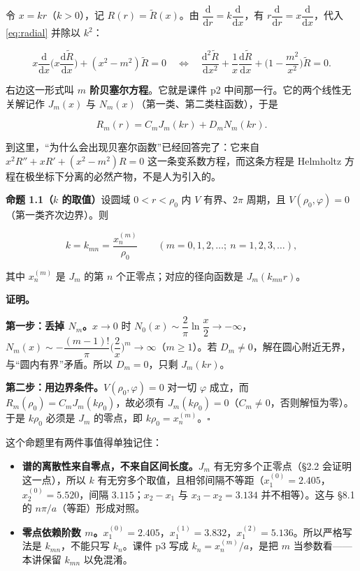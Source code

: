 \documentclass[11pt]{ctexart}
\let\origsubhdr\subhdr
\renewcommand{\subhdr}[1]{\par\needspace{3\baselineskip}\origsubhdr{#1}}
\newcommand{\pfline}{\par\smallskip\noindent\textbf{证明。}\enspace}
\begin{document}

令 $x=kr$（$k>0$），记 $R(r)=\tilde R(x)$。由 $\dfrac{\mathrm d}{\mathrm dr}=k\dfrac{\mathrm d}{\mathrm dx}$，有 $r\dfrac{\mathrm d}{\mathrm dr}=x\dfrac{\mathrm d}{\mathrm dx}$，代入 \eqref{eq:radial} 并除以 $k^2$：

\begin{equation}
x\frac{\mathrm d}{\mathrm dx}\Big(x\frac{\mathrm d\tilde R}{\mathrm dx}\Big)+(x^2-m^2)\tilde R=0
\quad\Longleftrightarrow\quad
\frac{\mathrm d^2\tilde R}{\mathrm dx^2}+\frac1x\frac{\mathrm d\tilde R}{\mathrm dx}+\Big(1-\frac{m^2}{x^2}\Big)\tilde R=0 .
\label{eq:bessel}
\end{equation}

右边这一形式叫 \textbf{$m$ 阶贝塞尔方程}。它就是课件 p2 中间那一行。它的两个线性无关解记作 $J_m(x)$ 与 $N_m(x)$（第一类、第二类柱函数），于是

\begin{equation}
R_m(r)=C_mJ_m(kr)+D_mN_m(kr).
\label{eq:Rgen}
\end{equation}

到这里，“为什么会出现贝塞尔函数”已经回答完了：它来自 $x^2R''+xR'+(x^2-m^2)R=0$ 这一条变系数方程，而这条方程是 Helmholtz 方程在极坐标下分离的必然产物，不是人为引入的。


\textbf{命题 1.1（$k$ 的取值）}\quad 设圆域 $0<r<\rho_0$ 内 $V$ 有界、$2\pi$ 周期，且 $V(\rho_0,\varphi)=0$（第一类齐次边界）。则

\[
k=k_{mn}=\frac{x_n^{(m)}}{\rho_0}\qquad(m=0,1,2,\dots;\ n=1,2,3,\dots),
\]

其中 $x_n^{(m)}$ 是 $J_m$ 的第 $n$ 个正零点；对应的径向函数是 $J_m(k_{mn}r)$。

\pfline

\textbf{第一步：丢掉 $N_m$。}$x\to0$ 时 $N_0(x)\sim\dfrac2\pi\ln\dfrac x2\to-\infty$，$N_m(x)\sim-\dfrac{(m-1)!}{\pi}\Big(\dfrac2x\Big)^m\to\infty$（$m\ge1$）。若 $D_m\ne0$，解在圆心附近无界，与“圆内有界”矛盾。所以 $D_m=0$，只剩 $J_m(kr)$。

\textbf{第二步：用边界条件。}$V(\rho_0,\varphi)=0$ 对一切 $\varphi$ 成立，而 $R_m(\rho_0)=C_mJ_m(k\rho_0)$，故必须有 $J_m(k\rho_0)=0$（$C_m\ne0$，否则解恒为零）。于是 $k\rho_0$ 必须是 $J_m$ 的零点，即 $k\rho_0=x_n^{(m)}$。$\square$

这个命题里有两件事值得单独记住：

\begin{itemize}
  \item \textbf{谱的离散性来自零点，不来自区间长度。}$J_m$ 有无穷多个正零点（\S2.2 会证明这一点），所以 $k$ 有无穷多个取值，且相邻间隔不等距（$x_1^{(0)}=2.405$，$x_2^{(0)}=5.520$，间隔 $3.115$；$x_2-x_1$ 与 $x_3-x_2=3.134$ 并不相等）。这与 \S8.1 的 $n\pi/a$（等距）形成对照。
  \item \textbf{零点依赖阶数 $m$。}$x_1^{(0)}=2.405$，$x_1^{(1)}=3.832$，$x_1^{(2)}=5.136$。所以严格写法是 $k_{mn}$，不能只写 $k_n$。课件 p3 写成 $k_n=x_n^{(m)}/a$，是把 $m$ 当参数看——本讲保留 $k_{mn}$ 以免混淆。
\end{itemize}
\end{document}
